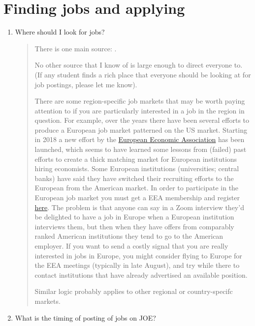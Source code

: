 \documentclass{\classes/econtex}
\begin{document}
\section*{Finding jobs and applying}

\begin{enumerate}
\item  Where should I look for jobs? 

  \begin{quote}
    There is one main source: \JOE.

    No other source that I know of is large enough to direct everyone to. (If any student finds a rich place that everyone should be looking at for job postings, please let me know).

    \hypertarget{Region-Specific-Job-Markets}{}
    
    There are some region-specific job markets that may be worth paying attention to if you are particularly interested in a job in the region in question.  For example, over the years there have been several efforts to produce a European job market patterned on the US market.  Starting in 2018 a new effort by the \href{https://www.eeassoc.org/}{European Economic Association} has been launched, which seems to have learned some lessons from (failed) past efforts to create a thick matching market for European institutions hiring economists. Some European institutions (universities; central banks) have said they have switched their recruiting efforts to the European from the American market.  In order to participate in the European job market you must get a EEA membership and register \href{https://www.europeanjobmarketofeconomists.org/}{here}.  The problem is that anyone can say in a Zoom interview they'd be delighted to have a job in Europe when a European institution interviews them, but then when they have offers from comparably ranked American institutions they tend to go to the American employer.  If you want to send a costly signal that you are really interested in jobs in Europe, you might consider flying to Europe for the EEA meetings (typically in late August), and try while there to contact institutions that have already advertised an available position.
 
    Similar logic probably applies to other regional or country-specifc markets.
  \end{quote}
  
\item What is the timing of posting of jobs on JOE? 


\end{enumerate}
\end{document}
